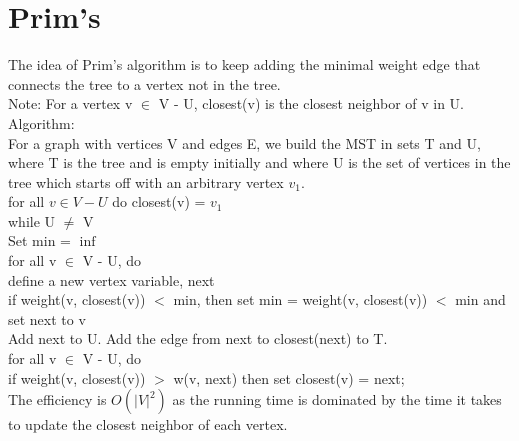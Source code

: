 \documentclass{article}
\newcommand\tab[1][1cm]{\hspace*{#1}}
\begin{document}
\section*{Prim's}
The idea of Prim's algorithm is to keep adding the minimal weight edge that connects the tree to a vertex not in the tree.\\
Note: For a vertex v $\in$ V - U, closest(v) is the closest neighbor of v in U. \\
Algorithm: \\
For a graph with vertices V and edges E, we build the MST in sets T and U, where T is the tree and is empty initially and where U is the set of vertices in the tree which starts off with an arbitrary vertex $v_1$. \\
for all $v \in V - U$ do closest(v) = $v_1$\\
while U $\neq$ V \\
\tab Set min = $\inf$ \\
\tab for all v $\in$ V - U, do \\
\tab \tab define a new vertex variable, next \\
\tab \tab if weight(v, closest(v)) $<$ min, then set min = weight(v, closest(v)) $<$ min and set next to v \\
\tab Add next to U. Add the edge from next to closest(next) to T.\\
\tab for all v $\in$ V - U, do \\
\tab \tab if weight(v, closest(v)) $>$ w(v, next) then set closest(v) = next; \\ 
The efficiency is $O(|V|^2)$ as the running time is dominated by the time it takes to update the closest neighbor of each vertex. 
\end{document}
